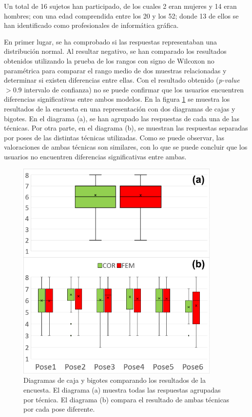Un total de 16 sujetos han participado, de los cuales 2 eran mujeres y 14 eran hombres;
con una edad comprendida entre los 20 y los 52; donde 13 de ellos se han identificado como profesionales de informática gráfica.


En primer lugar, se ha comprobado si las respuestas representaban una distribución normal. Al resultar negativo, se han comparado los resultados obtenidos utilizando la prueba de los rangos con signo de Wilcoxon no paramétrica para comparar el rango medio de dos muestras relacionadas y determinar si existen diferencias entre ellas. Con el resultado obtenido (\emph{p-value} $> 0.9$ intervalo de confianza) no se puede confirmar que los usuarios encuentren diferencias significativas entre ambos modelos. 
En la figura \ref{fig:stat} se muestra los resultados de la encuesta en una representación con dos diagramas de cajas y bigotes. En el diagrama (a), se han agrupado las respuestas de cada una de las técnicas. Por otra parte, en el diagrama (b), se muestran las respuestas separadas por poses de las distintas técnicas utilizadas. Como se puede observar, las valoraciones de ambas técnicas son similares, con lo que se puede concluir que los usuarios no encuentren diferencias significativas entre ambas.  
%

%

\begin{figure}[h]%
   \centering
   \includegraphics[width=0.9\textwidth]{IMG/boxplot}
    \caption{Diagramas de caja y bigotes comparando los resultados de la encuesta. El diagrama (a) muestra todas las respuestas agrupadas por técnica. El diagrama (b) compara el resultado de ambas técnicas por cada pose diferente.}
\label{fig:stat}
   \end{figure}


